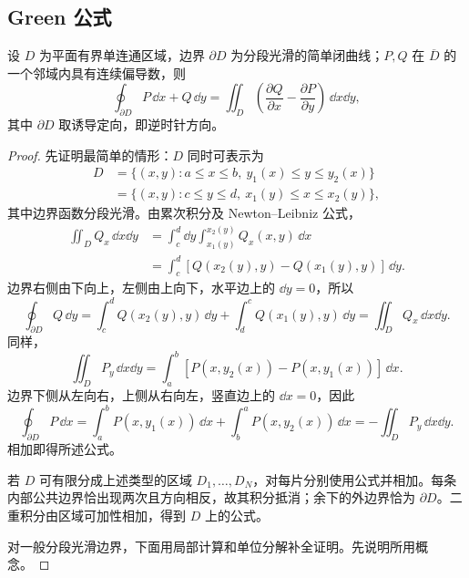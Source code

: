 \subsection*{Green 公式}
\begin{theorem}
设 $D$ 为平面有界单连通区域，边界 $\partial D$ 为分段光滑的简单闭曲线；$P,Q$ 在 $\overline D$ 的一个邻域内具有连续偏导数，则
\[
\oint_{\partial D}P\,\dd x+Q\,\dd y
=\displaystyle\iint_D\left(\frac{\partial Q}{\partial x}-\frac{\partial P}{\partial y}\right)\,\dd x\dd y,
\]
其中 $\partial D$ 取诱导定向，即逆时针方向。
\end{theorem}
\begin{proof}
先证明最简单的情形：$D$ 同时可表示为
\[
\begin{aligned}
D&=\{(x,y):a\le x\le b,\ y_1(x)\le y\le y_2(x)\}\\
&=\{(x,y):c\le y\le d,\ x_1(y)\le x\le x_2(y)\},
\end{aligned}
\]
其中边界函数分段光滑。由累次积分及 Newton--Leibniz 公式，
\begin{align*}
\displaystyle\iint_D Q_x\,\dd x\dd y
&=\int_c^d\dd y\int_{x_1(y)}^{x_2(y)}Q_x(x,y)\,\dd x\\
&=\int_c^d[Q(x_2(y),y)-Q(x_1(y),y)]\,\dd y.
\end{align*}
边界右侧由下向上，左侧由上向下，水平边上的 $\dd y=0$，所以
\[
\oint_{\partial D}Q\,\dd y
=\int_c^d Q(x_2(y),y)\,\dd y+\int_d^c Q(x_1(y),y)\,\dd y
=\displaystyle\iint_D Q_x\,\dd x\dd y.
\]
同样，
\[
\displaystyle\iint_D P_y\,\dd x\dd y
=\int_a^b[P(x,y_2(x))-P(x,y_1(x))]\,\dd x.
\]
边界下侧从左向右，上侧从右向左，竖直边上的 $\dd x=0$，因此
\[
\oint_{\partial D}P\,\dd x
=\int_a^bP(x,y_1(x))\,\dd x+\int_b^aP(x,y_2(x))\,\dd x
=-\displaystyle\iint_D P_y\,\dd x\dd y.
\]
相加即得所述公式。

若 $D$ 可有限分成上述类型的区域 $D_1,\ldots,D_N$，对每片分别使用公式并相加。每条内部公共边界恰出现两次且方向相反，故其积分抵消；余下的外边界恰为 $\partial D$。二重积分由区域可加性相加，得到 $D$ 上的公式。


对一般分段光滑边界，下面用局部计算和单位分解补全证明。先说明所用概念。
\end{proof}


